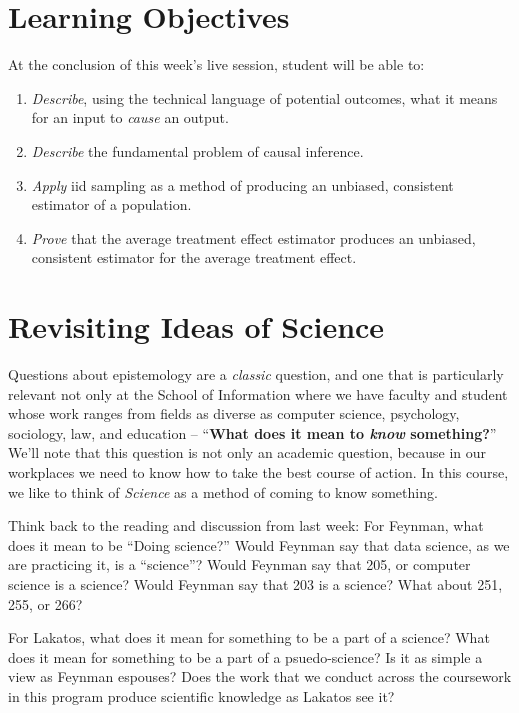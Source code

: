 \documentclass[
]{book}
\providecommand{\tightlist}{%
  \setlength{\itemsep}{0pt}\setlength{\parskip}{0pt}}
\begin{document}
\hypertarget{learning-objectives-1}{%
\section{Learning Objectives}\label{learning-objectives-1}}

At the conclusion of this week's live session, student will be able to:

\begin{enumerate}
\def\labelenumi{\arabic{enumi}.}
\tightlist
\item
  \emph{Describe}, using the technical language of potential outcomes,
  what it means for an input to \emph{cause} an output.
\item
  \emph{Describe} the fundamental problem of causal inference.
\item
  \emph{Apply} iid sampling as a method of producing an unbiased,
  consistent estimator of a population.
\item
  \emph{Prove} that the average treatment effect estimator produces an
  unbiased, consistent estimator for the average treatment effect.
\end{enumerate}

\hypertarget{revisiting-ideas-of-science}{%
\section{Revisiting Ideas of
Science}\label{revisiting-ideas-of-science}}

Questions about epistemology are a \emph{classic} question, and one that
is particularly relevant not only at the School of Information where we
have faculty and student whose work ranges from fields as diverse as
computer science, psychology, sociology, law, and education --
``\textbf{What does it mean to \emph{know} something?}'' We'll note that
this question is not only an academic question, because in our
workplaces we need to know how to take the best course of action. In
this course, we like to think of \emph{Science} as a method of coming to
know something.

Think back to the reading and discussion from last week: For Feynman,
what does it mean to be ``Doing science?'' Would Feynman say that data
science, as we are practicing it, is a ``science''? Would Feynman say
that 205, or computer science is a science? Would Feynman say that 203
is a science? What about 251, 255, or 266?

For Lakatos, what does it mean for something to be a part of a science?
What does it mean for something to be a part of a psuedo-science? Is it
as simple a view as Feynman espouses? Does the work that we conduct
across the coursework in this program produce scientific knowledge as
Lakatos see it?
\end{document}

